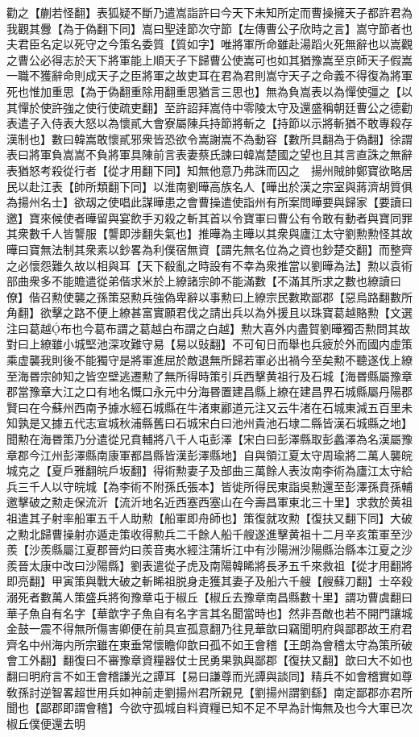 勸之【蒯若怪翻】表狐疑不斷乃遣嵩詣許曰今天下未知所定而曹操擁天子都許君為我觀其釁【為于偽翻下同】嵩曰聖逹節次守節【左傳曹公子欣時之言】嵩守節者也夫君臣名定以死守之今策名委質【質如字】唯將軍所命雖赴湯蹈火死無辭也以嵩觀之曹公必得志於天下將軍能上順天子下歸曹公使嵩可也如其猶豫嵩至京師天子假嵩一職不獲辭命則成天子之臣將軍之故吏耳在君為君則嵩守天子之命義不得復為將軍死也惟加重思【為于偽翻重除用翻重思猶言三思也】無為負嵩表以為憚使彊之【以其憚於使許強之使行使疏吏翻】至許詔拜嵩侍中零陵太守及還盛稱朝廷曹公之德勸表遣子入侍表大怒以為懷貳大會寮屬陳兵持節將斬之【持節以示將斬猶不敢專殺存漢制也】數曰韓嵩敢懷貳邪衆皆恐欲令嵩謝嵩不為動容【數所具翻為于偽翻】徐謂表曰將軍負嵩嵩不負將軍具陳前言表妻蔡氏諫曰韓嵩楚國之望也且其言直誅之無辭表猶怒考殺從行者【從才用翻下同】知無他意乃弗誅而囚之　揚州賊帥鄭寶欲略居民以赴江表【帥所類翻下同】以淮南劉曄高族名人【曄出於漢之宗室與蔣濟胡質俱為揚州名士】欲刼之使唱此謀曄患之會曹操遣使詣州有所案問曄要與歸家【要讀曰邀】寶來候使者曄留與宴飲手刃殺之斬其首以令寶軍曰曹公有令敢有動者與寶同罪其衆數千人皆讋服【讋即涉翻失氣也】推曄為主曄以其衆與廬江太守劉勲勲怪其故曄曰寶無法制其衆素以鈔畧為利僕宿無資【謂先無名位為之資也鈔楚交翻】而整齊之必懷怨難久故以相與耳【天下殽亂之時設有不幸為衆推當以劉曄為法】勲以袁術部曲衆多不能贍遣從弟偕求米於上繚諸宗帥不能滿數【不滿其所求之數也繚讀曰僚】偕召勲使襲之孫策惡勲兵強偽卑辭以事勲曰上繚宗民數欺鄙郡【惡烏路翻數所角翻】欲擊之路不便上繚甚富實願君伐之請出兵以為外援且以珠寶葛越賂勲【文選注曰葛越布也今葛布謂之葛越白布謂之白越】勲大喜外内盡賀劉曄獨否勲問其故對曰上繚雖小城堅池深攻難守易【易以䜴翻】不可旬日而舉也兵疲於外而國内虛策乘虚襲我則後不能獨守是將軍進屈於敵退無所歸若軍必出禍今至矣勲不聽遂伐上繚至海昬宗帥知之皆空壁逃遷勲了無所得時策引兵西擊黄祖行及石城【海昬縣屬豫章郡當豫章大江之口有地名慨口永元中分海昬置建昌縣上繚在建昌界石城縣屬丹陽郡賢曰在今蘇州西南予據水經石城縣在牛渚東酈道元注又云牛渚在石城東減五百里未知孰是又據五代志宣城秋浦縣舊曰石城宋白曰池州貴池石埭二縣皆漢石城縣之地】聞勲在海昬策乃分遣從兄賁輔將八千人屯彭澤【宋白曰彭澤縣取彭蠡澤為名漢屬豫章郡今江州彭澤縣南康軍都昌縣皆漢彭澤縣地】自與領江夏太守周瑜將二萬人襲皖城克之【夏戶雅翻皖戶坂翻】得術勲妻子及部曲三萬餘人表汝南李術為廬江太守給兵三千人以守皖城【為李術不附孫氏張本】皆徙所得民東詣吳勲還至彭澤孫賁孫輔邀擊破之勲走保流沂【流沂地名近西塞西塞山在今壽昌軍東北三十里】求救於黄祖祖遣其子射率船軍五千人助勲【船軍即舟師也】策復就攻勲【復扶又翻下同】大破之勲北歸曹操射亦遁走策收得勲兵二千餘人船千艘遂進擊黄祖十二月辛亥策軍至沙羨【沙羨縣屬江夏郡晉灼曰羨音夷水經注蒲圻江中有沙陽洲沙陽縣治縣本江夏之沙羨晉太康中改曰沙陽縣】劉表遣從子虎及南陽韓睎將長矛五千來救祖【從才用翻將即亮翻】甲寅策與戰大破之斬睎祖脱身走獲其妻子及船六千艘【艘蘇刀翻】士卒殺溺死者數萬人策盛兵將徇豫章屯于椒丘【椒丘去豫章南昌縣數十里】謂功曹虞翻曰華子魚自有名字【華歆字子魚自有名字言其名聞當時也】然非吾敵也若不開門讓城金鼓一震不得無所傷害卿便在前具宣孤意翻乃往見華歆曰竊聞明府與鄙郡故王府君齊名中州海内所宗雖在東垂常懷瞻仰歆曰孤不如王會稽【王朗為會稽太守為策所破會工外翻】翻復曰不審豫章資糧器仗士民勇果孰與鄙郡【復扶又翻】歆曰大不如也翻曰明府言不如王會稽謙光之譚耳【易曰謙尊而光譚與談同】精兵不如會稽實如尊敎孫討逆智畧超世用兵如神前走劉揚州君所親見【劉揚州謂劉繇】南定鄙郡亦君所聞也【鄙郡即謂會稽】今欲守孤城自料資糧已知不足不早為計悔無及也今大軍已次椒丘僕便還去明